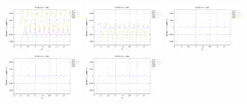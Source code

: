 \noindent
\includegraphics[width=3.5cm]{python_codes/fieldstone_152/RESULTS/exp1/d_t_16_m2}
\includegraphics[width=3.5cm]{python_codes/fieldstone_152/RESULTS/exp1/d_t_16_m3}
\includegraphics[width=3.5cm]{python_codes/fieldstone_152/RESULTS/exp1/d_t_16_m4}
\includegraphics[width=3.5cm]{python_codes/fieldstone_152/RESULTS/exp1/d_t_16_m5}
\includegraphics[width=3.5cm]{python_codes/fieldstone_152/RESULTS/exp1/d_t_16_m6}

